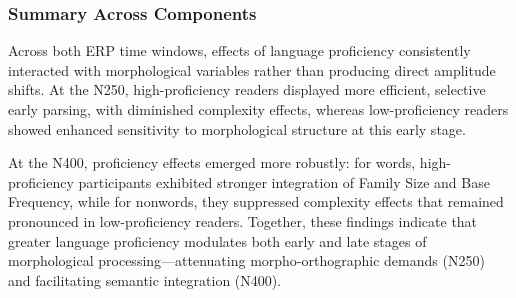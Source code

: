 \subsubsection{Summary Across Components}

Across both ERP time windows, effects of language proficiency consistently interacted with morphological variables rather than producing direct amplitude shifts.
At the N250, high-proficiency readers displayed more efficient, selective early parsing, with diminished complexity effects, whereas low-proficiency readers showed enhanced sensitivity to morphological structure at this early stage.

At the N400, proficiency effects emerged more robustly: for words, high-proficiency participants exhibited stronger integration of Family Size and Base Frequency, while for nonwords, they suppressed complexity effects that remained pronounced in low-proficiency readers.
Together, these findings indicate that greater language proficiency modulates both early and late stages of morphological processing—attenuating morpho-orthographic demands (N250) and facilitating semantic integration (N400).